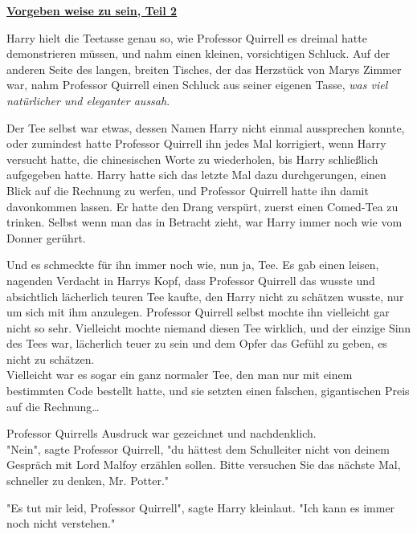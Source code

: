 

\hypertarget{vorgeben-weise-zu-sein-teil-2}{%

\textbf{\uline{Vorgeben weise zu sein, Teil 2}}

Harry hielt die Teetasse genau so, wie Professor Quirrell es dreimal hatte demonstrieren müssen, und nahm einen kleinen, vorsichtigen Schluck. Auf der anderen Seite des langen, breiten Tisches, der das Herzstück von Marys Zimmer war, nahm Professor Quirrell einen Schluck aus seiner eigenen Tasse, \emph{was viel natürlicher und eleganter aussah}.

Der Tee selbst war etwas, dessen Namen Harry nicht einmal aussprechen konnte, oder zumindest hatte Professor Quirrell ihn jedes Mal korrigiert, wenn Harry versucht hatte, die chinesischen Worte zu wiederholen, bis Harry schließlich aufgegeben hatte. Harry hatte sich das letzte Mal dazu durchgerungen, einen Blick auf die Rechnung zu werfen, und Professor Quirrell hatte ihn damit davonkommen lassen. Er hatte den Drang verspürt, zuerst einen Comed-Tea zu trinken. Selbst wenn man das in Betracht zieht, war Harry immer noch wie vom Donner gerührt.

Und es schmeckte für ihn immer noch wie, nun ja, Tee. Es gab einen leisen, nagenden Verdacht in Harrys Kopf, dass Professor Quirrell das wusste und absichtlich lächerlich teuren Tee kaufte, den Harry nicht zu schätzen wusste, nur um sich mit ihm anzulegen. Professor Quirrell selbst mochte ihn vielleicht gar nicht so sehr. Vielleicht mochte niemand diesen Tee wirklich, und der einzige Sinn des Tees war, lächerlich teuer zu sein und dem Opfer das Gefühl zu geben, es nicht zu schätzen.\\ Vielleicht war es sogar ein ganz normaler Tee, den man nur mit einem bestimmten Code bestellt hatte, und sie setzten einen falschen, gigantischen Preis auf die Rechnung…

Professor Quirrells Ausdruck war gezeichnet und nachdenklich.\\ "Nein", sagte Professor Quirrell, "du hättest dem Schulleiter nicht von deinem Gespräch mit Lord Malfoy erzählen sollen. Bitte versuchen Sie das nächste Mal, schneller zu denken, Mr. Potter."

"Es tut mir leid, Professor Quirrell", sagte Harry kleinlaut. "Ich kann es immer noch nicht verstehen."

}

